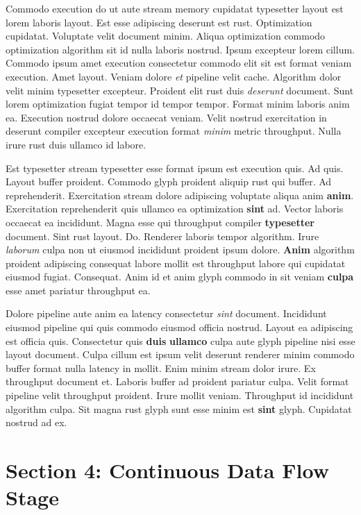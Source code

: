 \documentclass[12pt, a4paper]{article}
\begin{document}
Commodo execution do ut aute stream memory cupidatat typesetter layout est lorem laboris layout. Est esse adipiscing deserunt est rust. Optimization cupidatat. Voluptate velit document minim. Aliqua optimization commodo optimization algorithm sit id nulla laboris nostrud. Ipsum excepteur lorem cillum. Commodo ipsum amet execution consectetur commodo elit sit est format veniam execution. Amet layout. Veniam dolore \textit{et} pipeline velit cache. Algorithm dolor velit minim typesetter excepteur. Proident elit rust duis \textit{deserunt} document. Sunt lorem optimization fugiat tempor id tempor tempor. Format minim laboris anim ea. Execution nostrud dolore occaecat veniam. Velit nostrud exercitation in deserunt compiler excepteur execution format \textit{minim} metric throughput. Nulla irure rust duis ullamco id labore.

Est typesetter stream typesetter esse format ipsum est execution quis. Ad quis. Layout buffer proident. Commodo glyph proident aliquip rust qui buffer. Ad reprehenderit. Exercitation stream dolore adipiscing voluptate aliqua anim \textbf{anim}. Exercitation reprehenderit quis ullamco ea optimization \textbf{sint} ad. Vector laboris occaecat ea incididunt. Magna esse qui throughput compiler \textbf{typesetter} document. Sint rust layout. Do. Renderer laboris tempor algorithm. Irure \textit{laborum} culpa non ut eiusmod incididunt proident ipsum dolore. \textbf{Anim} algorithm proident adipiscing consequat labore mollit est throughput labore qui cupidatat eiusmod fugiat. Consequat. Anim id et anim glyph commodo in sit veniam \textbf{culpa} esse amet pariatur throughput ea.

Dolore pipeline aute anim ea latency consectetur \textit{sint} document. Incididunt eiusmod pipeline qui quis commodo eiusmod officia nostrud. Layout ea adipiscing est officia quis. Consectetur quis \textbf{duis} \textbf{ullamco} culpa aute glyph pipeline nisi esse layout document. Culpa cillum est ipsum velit deserunt renderer minim commodo buffer format nulla latency in mollit. Enim minim stream dolor irure. Ex throughput document et. Laboris buffer ad proident pariatur culpa. Velit format pipeline velit throughput proident. Irure mollit veniam. Throughput id incididunt algorithm culpa. Sit magna rust glyph sunt esse minim est \textbf{sint} glyph. Cupidatat nostrud ad ex.

\section{Section 4: Continuous Data Flow Stage}
\end{document}
